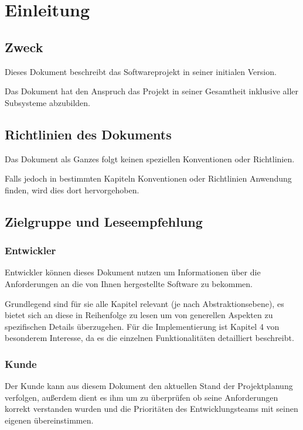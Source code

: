 \section{Einleitung}
\subsection{Zweck}
Dieses Dokument beschreibt das Softwareprojekt  in seiner initialen Version.

Das Dokument hat den Anspruch das Projekt in seiner Gesamtheit inklusive aller Subsysteme abzubilden.

\subsection{Richtlinien des Dokuments}
Das Dokument als Ganzes folgt keinen speziellen Konventionen oder Richtlinien. 

Falls jedoch in bestimmten Kapiteln Konventionen oder Richtlinien Anwendung finden, wird dies dort hervorgehoben. 

\subsection{Zielgruppe und Leseempfehlung}
\subsubsection{Entwickler}

Entwickler können dieses Dokument nutzen um Informationen über die Anforderungen an die von Ihnen hergestellte Software zu bekommen. 

Grundlegend sind für sie alle Kapitel relevant (je nach Abstraktionsebene), es bietet sich an diese in Reihenfolge zu lesen um von generellen Aspekten zu spezifischen Details überzugehen. 
Für die Implementierung ist Kapitel 4 von besonderem Interesse, da es die einzelnen Funktionalitäten detailliert beschreibt.

\subsubsection{Kunde}

Der Kunde kann aus diesem Dokument den aktuellen Stand der Projektplanung verfolgen, 
außerdem dient es ihm um zu überprüfen ob seine Anforderungen korrekt verstanden wurden und die Prioritäten des Entwicklungsteams mit seinen eigenen übereinstimmen.

